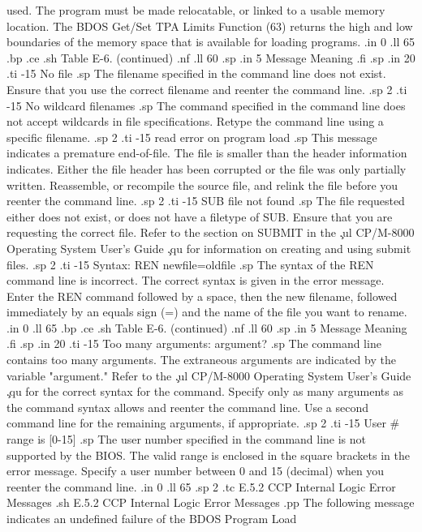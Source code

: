 used.  The program must be made relocatable, or linked to a usable 
memory location.  The BDOS Get/Set TPA Limits Function (63) returns 
the high and low boundaries of the memory space that is 
available for loading programs.
.in 0
.ll 65
.bp
.ce
.sh
Table E-6.  (continued)
.nf
.ll 60
.sp
.in 5
Message        Meaning
.fi
.sp
.in 20
.ti -15
No file
.sp
The filename specified in the command line does not exist.  Ensure that you 
use the correct filename and reenter the 
command line.
.sp 2
.ti -15
No wildcard filenames
.sp
The command specified in the command line does not accept 
wildcards in file specifications.  Retype the command line using a specific 
filename.
.sp 2
.ti -15
read error on program load
.sp
This message indicates a premature end-of-file.  The file is 
smaller than the header information indicates.  Either the file header has
been corrupted or the file was only partially written.  Reassemble, or 
recompile the source file, and relink the file before you reenter the
command line.
.sp 2
.ti -15
SUB file not found
.sp
The file requested either does not exist, or does not have a
filetype of SUB.  Ensure that you are requesting the correct file.  
Refer to the section on SUBMIT in the \c
.ul
CP/M-8000 Operating System User's Guide \c
.qu
for information on creating and using submit files.  
.sp 2
.ti -15
Syntax:  REN newfile=oldfile
.sp
The syntax of the REN command line is incorrect.  The correct
syntax is given in the error message.  Enter the REN command followed by a 
space, then the new filename,
followed immediately by an equals 
sign (=) and the name of the file you want to rename.
.in 0
.ll 65
.bp
.ce
.sh
Table E-6.  (continued)
.nf
.ll 60
.sp
.in 5
Message        Meaning
.fi
.sp
.in 20
.ti -15
Too many arguments:  argument?
.sp
The command line contains too many arguments.
The extraneous arguments are indicated by the variable "argument."  Refer to 
the \c
.ul
CP/M-8000 Operating System User's Guide \c
.qu
for the correct syntax for the 
command.  Specify only as many arguments as the command syntax allows
and reenter the command line.  Use a second command line for the remaining 
arguments, if appropriate. 
.sp 2
.ti -15
User # range is [0-15]
.sp
The user number specified in the command line is not supported
by the BIOS.  The valid range is enclosed in the square brackets in 
the error message.  Specify a user number between 0 and 15 (decimal) when you 
reenter the command line.
.in 0
.ll 65
.sp 2
.tc         E.5.2  CCP Internal Logic Error Messages
.sh
E.5.2  CCP Internal Logic Error Messages
.pp
The following message indicates an undefined failure of the BDOS Program Load 
